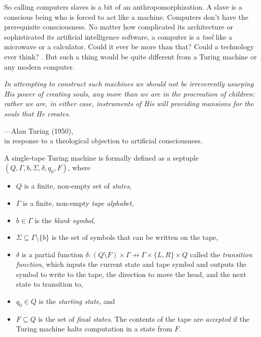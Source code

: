 \begin{tcolorbox}[breakable, enhanced, colback=textbook-blue, sharp corners]
	So calling computers slaves is a bit of an anthropomorphization. A slave is a conscious being who is forced to act like a machine. Computers don't have the prerequisite consciousness. No matter how complicated its architecture or sophisticated its artificial intelligence software, a computer is a \textit{tool} like a microwave or a calculator. Could it ever be more than that? Could a technology ever think? . But such a thing would be quite different from a Turing machine or any modern computer. \\
	
	\parbreak
	
	\begin{displayquote}
		\textit{In attempting to construct such machines we should not be irreverently usurping His power of creating souls, any more than we are in the procreation of children: rather we are, in either case, instruments of His will providing mansions for the souls that He creates.}
		\vspace{4mm}
		\begin{flushright}
			---Alan Turing (1950), \\
			in response to a theological objection to artificial consciousness.
		\end{flushright}
	\end{displayquote}
	\vspace{3mm}
\end{tcolorbox}
\vspace{2\baselineskip}

A single-tape Turing machine is formally defined as a septuple $(Q,\Gamma,b,\Sigma,\delta,q_0,F)$, where

\begin{itemize}
	\item $Q$ is a finite, non-empty set of \textit{states},
	\item $\Gamma$ is a finite, non-empty \textit{tape alphabet},
	\item $b\in\Gamma$ is the \textit{blank symbol},
	\item $\Sigma\subseteq\Gamma\setminus \{b\}$ is the set of symbols that can be written on the tape,
	\item $\delta$ is a partial function $\delta : (Q\setminus F)\times\Gamma\nrightarrow \Gamma\times\{L,R\}\times Q$ called the \textit{transition function}, which inputs the current state and tape symbol and outputs the symbol to write to the tape, the direction to move the head, and the next state to transition to,
	\item $q_0\in Q$ is the \textit{starting state}, and
	\item $F\subseteq Q$ is the set of \textit{final states}. The contents of the tape are \textit{accepted} if the Turing machine halts computation in a state from $F$.
\end{itemize}

